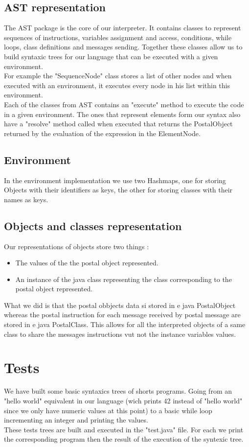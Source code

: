 \documentclass{eplDoc}
\begin{document}
\subsection{AST representation}
The AST package is the core of our interpreter. It contains classes to represent sequences of instructions, variables assignment and access, conditions, while loops, class definitions and messages sending. Together these classes allow us to build syntaxic trees for our language that can be executed with a given environment. \\ 
For example the "SequenceNode" class stores a list of other nodes and when executed with an environment, it executes every node in his list within this environment. \\ 
Each of the classes from AST contains an "execute" method to execute the code in a given environment. The ones that represent elements form our syntax also have a "resolve" method called when executed that returns the PostalObject returned by the evaluation of the expression in the ElementNode. 

\subsection{Environment}

In the environment implementation we use two Hashmaps, one for storing Objects with their identifiers as keys, the other for storing classes with their names as keys. \\ 


\subsection{Objects and classes representation}

Our representations of objects store two things : 
\begin{itemize}
	\item The values of the the postal object represented.
	\item An instance of the java class representing the class corresponding to the postal object represented.
\end{itemize}
What we did is that the postal obbjects data si stored in e java PostalObject whereas the postal instruction for each message received by postal message are stored in e java PostalClass. This allows for all the interpreted objects of a same class to share the messages instructions vut not the instance variables values. 

\section{Tests}

We have built some basic syntaxics trees of shorts programs. Going from an "hello world" equivalent in our language (wich prints 42 instead of "hello world" since we only have numeric values at this point) to a basic while loop incrementing an integer and printing the values. \\ 
These tests trees are built and executed in the "test.java" file. For each we print the corresponding program then the result of the execution of the syntexic tree. 
\end{document}
